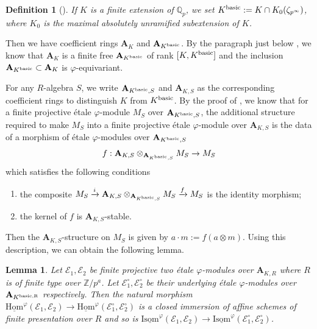 \documentclass[10pt]{article}
\newtheorem{lem}[thm]{Lemma}
\newtheorem{dfn}[thm]{Definition}
\numberwithin{equation}{section}
\newcommand{\bQ}{{\mathbb Q}}
\newcommand{\bZ}{{\mathbb Z}}
\newcommand{\calE}{{\mathcal E}}
\newcommand{\Hom}{{\mathrm{Hom}}}           %
\newcommand{\Isom}{{\mathrm{Isom}}}         %
\newcommand{\bfA}{{\textbf{A}}}
\begin{document}
\begin{dfn}[{\cite[Definition 3.2.3]{EG22}}]
    If $K$ is a finite extension of $\bQ_p$, we set $K^{\rm basic}:=K\cap K_0(\zeta_{p^{\infty}})$, where $K_0$ is the maximal absolutely unramified subextension of $K$.
\end{dfn}
Then we have coefficient rings $\bfA_K$ and $\bfA_{K^{\rm basic}}$. By the paragraph just below \cite[Definition 3.2.3]{EG22}, we know that $\bfA_K$ is a finite free $\bfA_{K^{\rm basic}}$ of rank $[K,K^{\rm basic}]$ and the inclusion $\bfA_{K^{\rm basic}}\subset \bfA_K$ is $\varphi$-equivariant.

For any $R$-algebra $S$, we write $\bfA_{K^{\rm basic},S}$ and $\bfA_{K,S}$ as the corresponding coefficient rings to distinguish  $K$ from $K^{\rm basic}$. By the proof of \cite[Lemma 3.2.5]{EG22}, we know that for a finite projective \'etale $\varphi$-module $M_S$ over $\bfA_{K^{\rm basic},S}$, the additional structure required to make $M_S$ into a finite projective \'etale $\varphi$-module over $\bfA_{K,S}$ is the data of a morphism of \'etale $\varphi$-modules over $\bfA_{K^{\rm basic},S}$
\[
f:\bfA_{K,S}\otimes_{\bfA_{K^{\rm basic},S}}M_S\to M_S
\]
which satisfies the following conditions
\begin{enumerate}
    \item the composite $M_S\xrightarrow{i}\bfA_{K,S}\otimes_{\bfA_{K^{\rm basic},S}}M_S\xrightarrow{f} M_S$ is the identity morphism;
    \item the kernel of $f$ is $\bfA_{K,S}$-stable.
\end{enumerate}
Then the $\bfA_{K,S}$-structure on $M_S$ is given by $a\cdot m:=f(a\otimes m)$. Using this description, we can obtain the following lemma.

\begin{lem}\label{reduction-basic}
     Let $\calE_1,\calE_2$ be finite projective two \'etale $\varphi$-modules over $\bfA_{K,R}$ where $R$ is of finite type over $\bZ/p^a$. Let $\calE_1^{\circ},\calE_2^{\circ}$ be their underlying \'etale $\varphi$-modules over $\bfA_{K^{\rm basic,R}}$ respectively. Then the natural morphism $\underline\Hom^{\varphi}(\calE_1,\calE_2)\to \underline\Hom^{\varphi}(\calE_1^{\circ},\calE_2^{\circ})$ is a closed immersion of affine schemes of finite presentation over $R$ and so is $\underline\Isom^{\varphi}(\calE_1,\calE_2)\to \underline\Isom^{\varphi}(\calE_1^{\circ},\calE_2^{\circ})$.
\end{lem}
\end{document}
